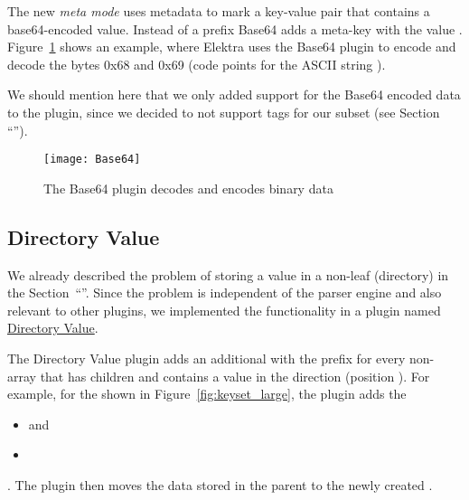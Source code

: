 The new \emph{meta mode} uses metadata to mark a key-value pair that contains a base64-encoded value. Instead of a prefix Base64 adds a meta-key  with the value . Figure~\ref{fig:base64} shows an example, where Elektra uses the Base64 plugin to encode and decode the bytes 0x68 and 0x69 (code points for the ASCII string ).

We should mention here that we only added support for the Base64 encoded data to the \LinkYAMLCPP{} plugin, since we decided to not support tags for our  subset (see Section “”).

\begin{figure}
  \centering
    \texttt{[image: Base64]}
  \caption{The Base64 plugin decodes and encodes binary data}
  \label{fig:base64}
\end{figure}

\subsection{Directory Value}

We already described the problem of storing a value in a non-leaf (directory)  in the Section~“”. Since the problem is independent of the parser engine and also relevant to other plugins, we implemented the functionality in a plugin named \href{http://libelektra.org/plugins/directoryvalue}{Directory Value}.

The Directory Value plugin adds an additional  with the prefix  for every non-array  that has children and contains a value in the  direction (position ). For example, for the  shown in Figure~\ref{fig:keyset_large}, the plugin adds the 

\begin{itemize}
  \item {} and
  \item {}
\end{itemize}

. The plugin then moves the data stored in the parent  to the newly created .

